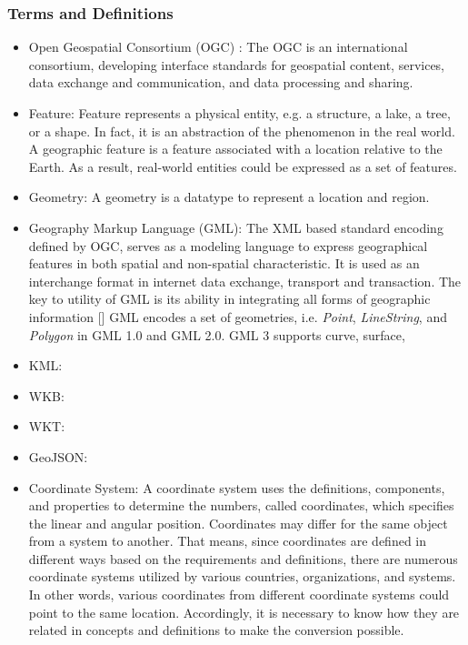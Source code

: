 \documentclass[a4paper,12pt]{article}
\begin{document}
\subsubsection{Terms and Definitions}
\label{termsanddef}
\begin{itemize}

\item Open Geospatial Consortium (OGC) \cite{ogc}: The OGC is an international consortium, developing interface standards for geospatial content, services, data exchange and communication, and data processing and sharing.
\item Feature: Feature represents a physical entity, e.g. a structure, a lake, a tree, or a shape. In fact, it is an abstraction of the phenomenon in the real world. A geographic feature is a feature associated with a location relative to the Earth. As a result, real-world entities could be expressed as a set of features. 
\item Geometry: A geometry is a datatype to represent a location and region. 
\item Geography Markup Language (GML): The XML based standard encoding defined by OGC, serves as a modeling language to express geographical features in both spatial and non-spatial characteristic. It is used as an interchange format in internet data exchange, transport and transaction. The key to utility of GML is its ability in integrating all forms of geographic information [] %
GML encodes a set of geometries, i.e. \textit{Point}, \textit{LineString}, and \textit{Polygon} in GML 1.0 and GML 2.0. GML 3 supports curve, surface, 
\item KML: 
\item WKB:
\item WKT:
\item GeoJSON:
\item Coordinate System: A coordinate system uses the definitions, components, and properties to determine the numbers, called coordinates, which specifies the linear and angular position. Coordinates may differ for the same object from a system to another. That means, since coordinates are defined in different ways based on the requirements and definitions, there are numerous coordinate systems utilized by various countries, organizations, and systems. In other words, various coordinates from different coordinate systems could point to the same location. Accordingly, it is necessary to know how they are related in concepts and definitions to make the conversion possible.

\end{itemize}
\end{document}
